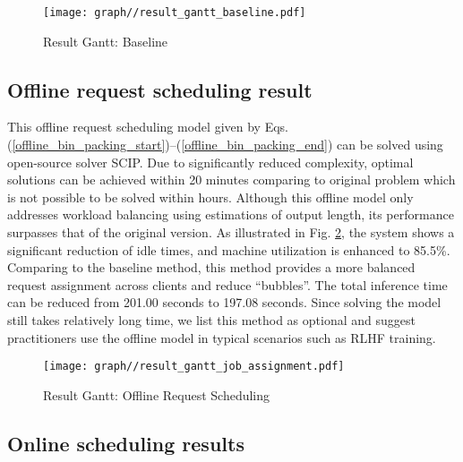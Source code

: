 \begin{figure}
    \centering
    \texttt{[image: graph//result\_gantt\_baseline.pdf]}
    \begin{flushleft}
    \vspace{-2em}
    \caption*{Utilization rate: 80.2\%. Total inference time: 201.00 seconds.}
    \end{flushleft}
    \vspace{-2em}
    \caption{Result Gantt: Baseline}
    \label{fig:baseline}
\end{figure}

\subsection{Offline request scheduling result}
This offline request scheduling model given by Eqs.  (\ref{offline_bin_packing_start})--(\ref{offline_bin_packing_end}) can be solved using open-source solver SCIP. Due to significantly reduced complexity, optimal solutions can be achieved within 20 minutes comparing to original problem which is not possible to be solved within hours. Although this offline model only addresses workload balancing using estimations of output length, its performance surpasses that of the original version. As illustrated in Fig. \ref{fig:offline_assignment}, the system shows a significant reduction of idle times, and machine utilization is enhanced to 85.5\%. Comparing to the baseline method, this method provides a more balanced request assignment across clients and reduce ``bubbles''. The total inference time can be reduced from 201.00 seconds to 197.08 seconds. Since solving the model still takes relatively long time, we list this method as optional and suggest practitioners use the offline model in typical scenarios such as RLHF training. 

\begin{figure}
    \centering
    \texttt{[image: graph//result\_gantt\_job\_assignment.pdf]}
    \begin{flushleft}
    \vspace{-2em}
    \caption*{Utilization rate: 85.5\%. Total inference time: 197.08 seconds.}
    \end{flushleft}
    \vspace{-2em}
    \caption{Result Gantt: Offline Request Scheduling}
    \label{fig:offline_assignment}
\end{figure}


\subsection{Online scheduling results}

